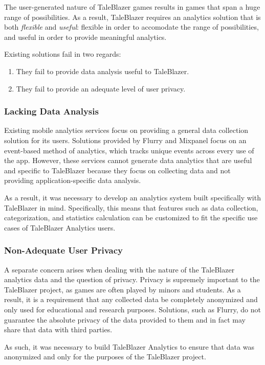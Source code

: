 The user-generated nature of TaleBlazer games results in games that span a huge range of possibilities. As a result, TaleBlazer requires an analytics solution that is both \textit{flexible} and \textit{useful}: flexible in order to accomodate the range of possibilities, and useful in order to provide meaningful analytics.

Existing solutions fail in two regards:
\begin{enumerate}
	\item They fail to provide data analysis useful to TaleBlazer.
	\item They fail to provide an adequate level of user privacy.
\end{enumerate}

\subsubsection{Lacking Data Analysis}

Existing mobile analytics services focus on providing a general data collection solution for its users. Solutions provided by Flurry and Mixpanel focus on an event-based method of analytics, which tracks unique events across every use of the app. However, these services cannot generate data analytics that are useful and specific to TaleBlazer because they focus on collecting data and not providing application-specific data analysis.

As a result, it was necessary to develop an analytics system built specifically with TaleBlazer in mind. Specifically, this means that features such as data collection, categorization, and statistics calculation can be customized to fit the specific use cases of TaleBlazer Analytics users. 

\subsubsection{Non-Adequate User Privacy}

A separate concern arises when dealing with the nature of the TaleBlazer analytics data and the question of privacy. Privacy is supremely important to the TaleBlazer project, as games are often played by minors and students. As a result, it is a requirement that any collected data be completely anonymized and only used for educational and research purposes. Solutions, such as Flurry, do not guarantee the absolute privacy of the data provided to them and in fact may share that data with third parties. \cite{site:flurry}

As such, it was necessary to build TaleBlazer Analytics to ensure that data was anonymized and only for the purposes of the TaleBlazer project. 





















